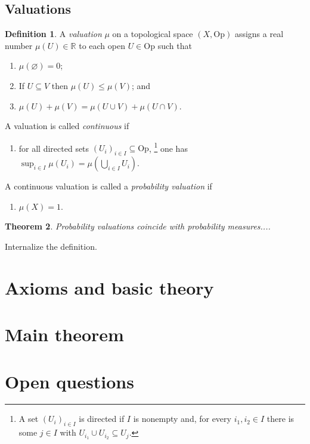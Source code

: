 \documentclass[11pt, oneside, article]{memoir}
\theoremstyle{plain}
\newtheorem{theorem}{Theorem}[chapter] %
\theoremstyle{definition}
\newtheorem{definition}[theorem]{Definition}
\theoremstyle{remark}
\renewcommand{\ss}{\subseteq}
\newcommand{\Set}[1]{\mathrm{#1}}
\newcommand{\rr}{\mathbb{R}}
\newcommand{\Op}{\Set{Op}}
\begin{document}
\section{Valuations}

\begin{definition}
A \emph{valuation} $\mu$ on a topological space $(X,\Op)$ assigns a real number $\mu(U)\in\rr$ to each open $U\in\Op$ such that
\begin{enumerate}
	\item $\mu(\varnothing)=0$;
	\item If $U\ss V$ then $\mu(U)\leq\mu(V)$; and
	\item $\mu(U)+\mu(V)=\mu(U\cup V)+\mu(U\cap V)$.
\end{enumerate}
A valuation is called \emph{continuous} if
\begin{enumerate}[resume]
	\item for all directed sets $(U_i)_{i\in I}\ss\Op$,%
	\footnote{A set $(U_i)_{i\in I}$ is directed if $I$ is nonempty and, for every $i_1,i_2\in I$ there is some $j\in I$ with $U_{i_1}\cup U_{i_2}\ss U_j$.}
	 one has $\sup_{i\in I}\mu(U_i)=\mu(\bigcup_{i\in I}U_i)$.
\end{enumerate}
A continuous valuation is called a \emph{probability valuation} if
\begin{enumerate}[resume]
	\item $\mu(X)=1$.
\end{enumerate}
\end{definition}

\begin{theorem}
Probability valuations coincide with probability measures....
\end{theorem}

Internalize the definition.

\chapter{Axioms and basic theory}

\chapter{Main theorem}

\chapter{Open questions}
\end{document}
